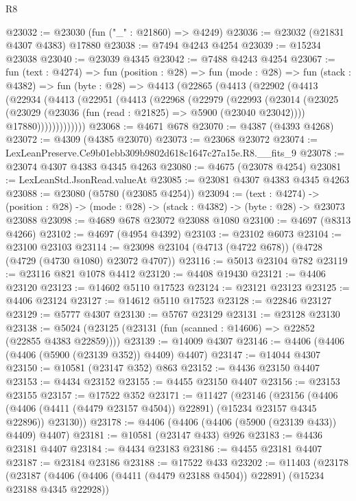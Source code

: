 \begin{lexlean}{R8}
\begin{coremodule}
@23032 := @23030 (fun ("_" : @21860) => @4249)
@23036 := @23032 (@21831 @4307 @4383) @17880
@23038 := @7494 @4243 @4254
@23039 := @15234 @23038
@23040 := @23039 @4345
@23042 := @7488 @4243 @4254
@23067 := fun (text : @4274) =>
  fun (position : @28) =>
  fun (mode : @28) =>
  fun (stack : @4382) =>
  fun (byte : @28) =>
  @4413
    (@22865
      (@4413
        (@22902
          (@4413
            (@22934
              (@4413
                (@22951
                  (@4413
                    (@22968
                      (@22979
                        (@22993
                          (@23014
                            (@23025
                              (@23029 (@23036 (fun (read : @21825) => @5900 (@23040 @23042))))
                              @17880)))))))))))))
@23068 := @4671 @678
@23070 := @4387 (@4393 @4268)
@23072 := @4309 (@4385 @23070)
@23073 := @23068 @23072
@23074 := LexLeanPreserve.Ce9b01ebb309b9802d618c1647c27a15e.R8.__fits_9
@23078 := @23074 @4307 @4383 @4345 @4263
@23080 := @4675 (@23078 @4254)
@23081 := LexLeanStd.JsonRead.valueAt
@23085 := @23081 @4307 @4383 @4345 @4263
@23088 := @23080 (@5780 (@23085 @4254))
@23094 := (text : @4274) ->
  (position : @28) -> (mode : @28) -> (stack : @4382) -> (byte : @28) -> @23073 @23088
@23098 := @4689 @678 @23072 @23088 @1080
@23100 := @4697 (@8313 @4266)
@23102 := @4697 (@4954 @4392)
@23103 := @23102 @6073
@23104 := @23100 @23103
@23114 := @23098 @23104 (@4713 (@4722 @678)) (@4728 (@4729 (@4730 @1080) @23072 @4707))
@23116 := @5013 @23104 @782
@23119 := @23116 @821 @1078 @4412
@23120 := @4408 @19430
@23121 := @4406 @23120
@23123 := @14602 @5110 @17523
@23124 := @23121 @23123
@23125 := @4406 @23124
@23127 := @14612 @5110 @17523
@23128 := @22846 @23127
@23129 := @5777 @4307
@23130 := @5767 @23129
@23131 := @23128 @23130
@23138 := @5024 (@23125 (@23131 (fun (scanned : @14606) => @22852 (@22855 @4383 @22859))))
@23139 := @14009 @4307
@23146 := @4406 (@4406 (@4406 (@5900 (@23139 @352)) @4409) @4407)
@23147 := @14044 @4307
@23150 := @10581 (@23147 @352) @863
@23152 := @4436 @23150 @4407
@23153 := @4434 @23152
@23155 := @4455 @23150 @4407
@23156 := @23153 @23155
@23157 := @17522 @352
@23171 := @11427
    (@23146
      (@23156
        (@4406 (@4406 (@4411 (@4479 @23157 @4504)) @22891) (@15234 @23157 @4345 @22896))
        @23130))
@23178 := @4406 (@4406 (@4406 (@5900 (@23139 @433)) @4409) @4407)
@23181 := @10581 (@23147 @433) @926
@23183 := @4436 @23181 @4407
@23184 := @4434 @23183
@23186 := @4455 @23181 @4407
@23187 := @23184 @23186
@23188 := @17522 @433
@23202 := @11403
    (@23178
      (@23187
        (@4406 (@4406 (@4411 (@4479 @23188 @4504)) @22891) (@15234 @23188 @4345 @22928))

\end{coremodule}
\end{lexlean}
